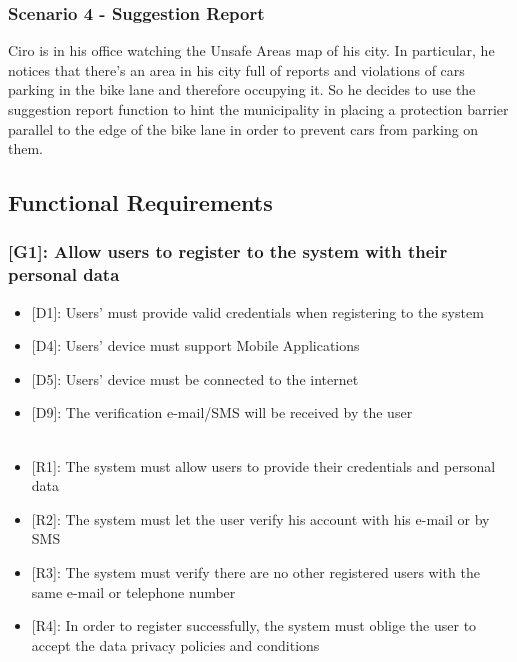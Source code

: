 \documentclass[12pt,a4paper]{article}
\begin{document}
\subsubsection*{Scenario 4 - Suggestion Report}
Ciro is in his office watching the Unsafe Areas map of his city. In particular, he notices that there's an area in his city full of reports and violations of cars parking in the bike lane and therefore occupying it. So he decides to use the suggestion report function to hint the municipality in placing a protection barrier parallel to the edge of the bike lane in order to prevent cars from parking on them.
\newpage
\subsection{Functional Requirements}
\subsubsection*{{[}{G1}{]}: Allow users to register to the system with their personal data}
\begin{itemize}
\item {[D1]}: Users' must provide valid credentials when registering to the system
\item {[D4]}: Users' device must support Mobile Applications
\item {[D5]}: Users' device must be connected to the internet
\item {[D9]}: The verification e-mail/SMS will be received by the user 
\\\\
\item {[R1]}: The system must allow users to provide their credentials and personal data
\item {[R2]}: The system must let the user verify his account with his e-mail or by SMS
\item {[R3]}: The system must verify there are no other registered users with the same e-mail or telephone number
\item {[R4]}: In order to register successfully, the system must oblige the user to accept the data privacy policies and conditions
\end{itemize}
\end{document}
